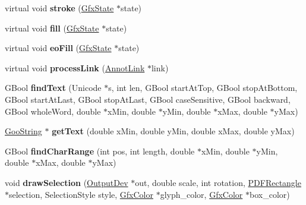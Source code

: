 \begin{DoxyCompactItemize}
\item 
\mbox{\label{class_text_output_dev_a379b4616aa462602a9f365931a864c65}} 
virtual void {\bfseries stroke} (\hyperlink{class_gfx_state}{Gfx\+State} $\ast$state)
\item 
\mbox{\label{class_text_output_dev_ab108917a431abe35f3c24473ca946eed}} 
virtual void {\bfseries fill} (\hyperlink{class_gfx_state}{Gfx\+State} $\ast$state)
\item 
\mbox{\label{class_text_output_dev_ac373cb05b27381b987a098f868e4c857}} 
virtual void {\bfseries eo\+Fill} (\hyperlink{class_gfx_state}{Gfx\+State} $\ast$state)
\item 
\mbox{\label{class_text_output_dev_a3bf6c0dfcb73576afc0bfb26c1796591}} 
virtual void {\bfseries process\+Link} (\hyperlink{class_annot_link}{Annot\+Link} $\ast$link)
\item 
\mbox{\label{class_text_output_dev_ab82f19c9d27d87c82a25d40e2b943f49}} 
G\+Bool {\bfseries find\+Text} (Unicode $\ast$s, int len, G\+Bool start\+At\+Top, G\+Bool stop\+At\+Bottom, G\+Bool start\+At\+Last, G\+Bool stop\+At\+Last, G\+Bool case\+Sensitive, G\+Bool backward, G\+Bool whole\+Word, double $\ast$x\+Min, double $\ast$y\+Min, double $\ast$x\+Max, double $\ast$y\+Max)
\item 
\mbox{\label{class_text_output_dev_a5e9e6ced3ee79e097feabd802594132a}} 
\hyperlink{class_goo_string}{Goo\+String} $\ast$ {\bfseries get\+Text} (double x\+Min, double y\+Min, double x\+Max, double y\+Max)
\item 
\mbox{\label{class_text_output_dev_a9e28973f3c68c2cf2a8c8f392607fba1}} 
G\+Bool {\bfseries find\+Char\+Range} (int pos, int length, double $\ast$x\+Min, double $\ast$y\+Min, double $\ast$x\+Max, double $\ast$y\+Max)
\item 
\mbox{\label{class_text_output_dev_a21d67999fb0220eb1e2f9cca2f8ed681}} 
void {\bfseries draw\+Selection} (\hyperlink{class_output_dev}{Output\+Dev} $\ast$out, double scale, int rotation, \hyperlink{class_p_d_f_rectangle}{P\+D\+F\+Rectangle} $\ast$selection, Selection\+Style style, \hyperlink{struct_gfx_color}{Gfx\+Color} $\ast$glyph\+\_\+color, \hyperlink{struct_gfx_color}{Gfx\+Color} $\ast$box\+\_\+color)

\end{DoxyCompactItemize}
